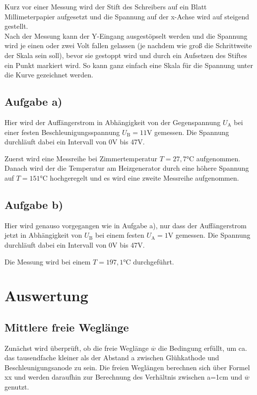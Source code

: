 \documentclass[titlepage = firstcover]{scrartcl}
\begin{document}
        Kurz vor einer Messung wird der Stift des Schreibers auf ein Blatt Millimeterpapier aufgesetzt und die Spannung auf der x-Achse wird auf steigend gestellt. \\

        Nach der Messung kann der Y-Eingang ausgestöpselt werden und die Spannung wird je einen oder zwei Volt fallen gelassen (je nachdem wie groß die Schrittweite der Skala sein soll), bevor sie gestoppt wird und durch ein Aufsetzen des Stiftes ein Punkt markiert wird. So kann ganz einfach eine Skala für die Spannung unter die Kurve gezeichnet werden.

        \subsection*{Aufgabe a)}
            Hier wird der Auffängerstrom in Abhängigkeit von der Gegenspannung $U_{\text{A}}$ bei einer festen Beschleunigungsspannung $U_{\text{B}} = 11$V gemessen. Die Spannung durchläuft dabei ein Intervall von 0V bis 47V.

            Zuerst wird eine Messreihe bei Zimmertemperatur $T = 27,7°$C aufgenommen. Danach wird der die Temperatur am Heizgenerator durch eine höhere Spannung auf $T = 151°$C hochgeregelt und es wird eine zweite Messreihe aufgenommen.
        
        \subsection*{Aufgabe b)}
            Hier wird genauso vorgegangen wie in Aufgabe a), nur dass der Auffängerstrom jetzt in Abhängigkeit von $U_{\text{B}}$ bei einem festen $U_{\text{A}} = 1$V gemessen. Die Spannung durchläuft dabei ein Intervall von 0V bis 47V.


            Die Messung wird bei einem $T = 197,1°$C durchgeführt.
    \newpage
    \section{Auswertung}    
        \subsection{Mittlere freie Weglänge}
            Zunächst wird überprüft, ob die freie Weglänge $\overline{w}$ die Bedingung erfüllt, um ca. das tausendfache kleiner als der Abstand a zwischen Glühkathode und Beschleunigungsanode zu sein.
            Die freien Weglängen berechnen sich über Formel xx und werden daraufhin zur Berechnung des Verhältnis zwischen a=1cm und $\overline{w}$ genutzt.
\end{document}
